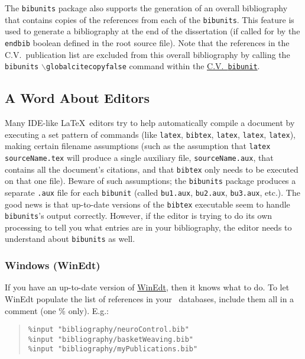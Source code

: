 The \texttt{bibunits} package also supports the generation of an overall bibliography that contains copies of the references from each of the \texttt{bibunits}.
This feature is used to generate a bibliography at the end of the dissertation (if called for by the \texttt{endbib} boolean defined in the root source file).
Note that the references in the C.V.\ publication list are excluded from this overall bibliography by calling the \texttt{bibunits} $\backslash$\texttt{globalcitecopyfalse} command within the \href{./backMatter/vita.tex}{C.V.\ \texttt{bibunit}}.

\subsection{A Word About Editors}
Many IDE-like \LaTeX\ editors try to help automatically compile a document by executing a set pattern of commands (like \texttt{latex}, \texttt{bibtex}, \texttt{latex}, \texttt{latex}, \texttt{latex}), making certain filename assumptions (such as the assumption that \texttt{latex sourceName.tex} will produce a single auxiliary file, \texttt{sourceName.aux}, that contains all the document's citations, and that \texttt{bibtex} only needs to be executed on that one file).
Beware of such assumptions; the \texttt{bibunits} package produces a separate \texttt{.aux} file for each \texttt{bibunit} (called \texttt{bu1.aux}, \texttt{bu2.aux}, \texttt{bu3.aux}, etc.).
The good news is that up-to-date versions of the \texttt{bibtex} executable seem to handle \texttt{bibunits}'s output correctly.
However, if the editor is trying to do its own processing to tell you what entries are in your bibliography, the editor needs to understand about \texttt{bibunits} as well.

\subsubsection{Windows (WinEdt)}
If you have an up-to-date version of \href{http://www.winedt.com}{WinEdt}, then it knows what to do.
To let WinEdt populate the list of references in your \BibTeX\ databases, include them all in a comment (one \% only).
E.g.:
\begin{quotation}%
\begin{verbatim}
%input "bibliography/neuroControl.bib"
%input "bibliography/basketWeaving.bib"
%input "bibliography/myPublications.bib"
\end{verbatim}%
\end{quotation}%

